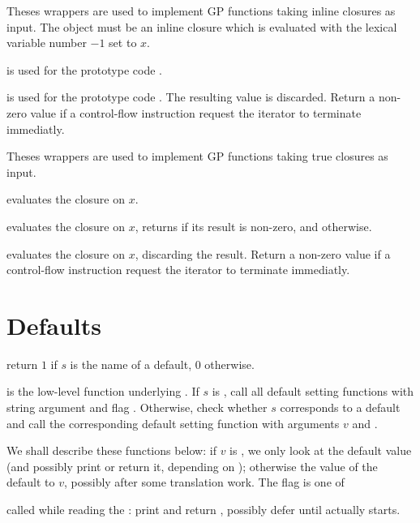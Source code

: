 Theses wrappers are used to implement GP functions taking
inline closures as input. The object  must be an inline closure which
is evaluated with the lexical variable number $-1$ set to $x$.

 is used for the prototype code .

 is used for the prototype code .
The resulting value is discarded.  Return a non-zero value if a control-flow
instruction request the iterator to terminate immediatly.

Theses wrappers are used to implement GP functions taking
true closures as input.

 evaluates the closure  on $x$.

 evaluates the closure  on $x$,
returns  if its result is non-zero, and  otherwise.

 evaluates the closure  on $x$,
discarding the result. Return a non-zero value if a control-flow
instruction request the iterator to terminate immediatly.

\section{Defaults}

 return $1$ if $s$ is the name
of a default, $0$ otherwise.

 is the
low-level function underlying . If $s$ is , call all
default setting functions with string argument  and flag
. Otherwise, check whether $s$ corresponds to a default
and call the corresponding default setting function with arguments $v$ and
\fl.

We shall describe these functions below: if $v$ is , we only look
at the default value (and possibly print or return it, depending on
); otherwise the value of the default to $v$, possibly after some
translation work. The flag is one of

\item {} called while reading the  : print and return
, possibly defer until  actually starts.


